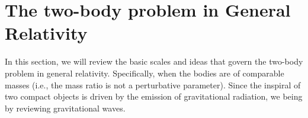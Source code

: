 


\section{The two-body problem in General Relativity}
\label{sec:TwoBody}
In this section, we will review the basic scales and ideas that govern the two-body problem in general relativity. Specifically, when the bodies are of comparable masses (i.e., the mass ratio is not a perturbative parameter). Since the inspiral of two compact objects is driven by the emission of gravitational radiation, we being by reviewing gravitational waves.


